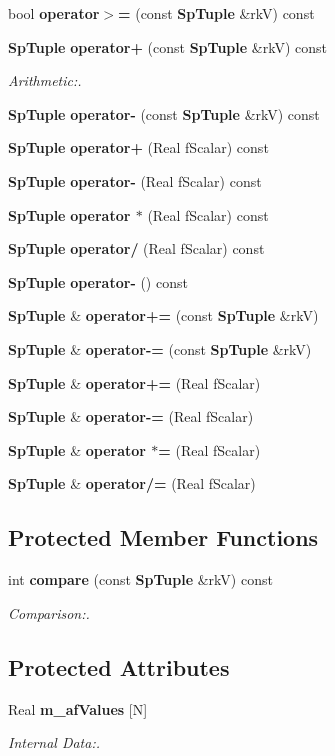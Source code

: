 \begin{CompactItemize}
bool {\bf operator$>$=} (const {\bf Sp\-Tuple} \&rk\-V) const
\item 
{\bf Sp\-Tuple} {\bf operator+} (const {\bf Sp\-Tuple} \&rk\-V) const
\begin{CompactList}\small\item\em Arithmetic:. \item\end{CompactList}\item 
{\bf Sp\-Tuple} {\bf operator-} (const {\bf Sp\-Tuple} \&rk\-V) const
\item 
{\bf Sp\-Tuple} {\bf operator+} (Real f\-Scalar) const
\item 
{\bf Sp\-Tuple} {\bf operator-} (Real f\-Scalar) const
\item 
{\bf Sp\-Tuple} {\bf operator $\ast$} (Real f\-Scalar) const
\item 
{\bf Sp\-Tuple} {\bf operator/} (Real f\-Scalar) const
\item 
{\bf Sp\-Tuple} {\bf operator-} () const
\item 
{\bf Sp\-Tuple} \& {\bf operator+=} (const {\bf Sp\-Tuple} \&rk\-V)
\item 
{\bf Sp\-Tuple} \& {\bf operator-=} (const {\bf Sp\-Tuple} \&rk\-V)
\item 
{\bf Sp\-Tuple} \& {\bf operator+=} (Real f\-Scalar)
\item 
{\bf Sp\-Tuple} \& {\bf operator-=} (Real f\-Scalar)
\item 
{\bf Sp\-Tuple} \& {\bf operator $\ast$=} (Real f\-Scalar)
\item 
{\bf Sp\-Tuple} \& {\bf operator/=} (Real f\-Scalar)
\end{CompactItemize}
\subsection*{Protected Member Functions}
\begin{CompactItemize}
\item 
int {\bf compare} (const {\bf Sp\-Tuple} \&rk\-V) const
\begin{CompactList}\small\item\em Comparison:. \item\end{CompactList}\end{CompactItemize}
\subsection*{Protected Attributes}
\begin{CompactItemize}
\item 
Real {\bf m\_\-af\-Values} [N]
\begin{CompactList}\small\item\em Internal Data:. \item\end{CompactList}\end{CompactItemize}


